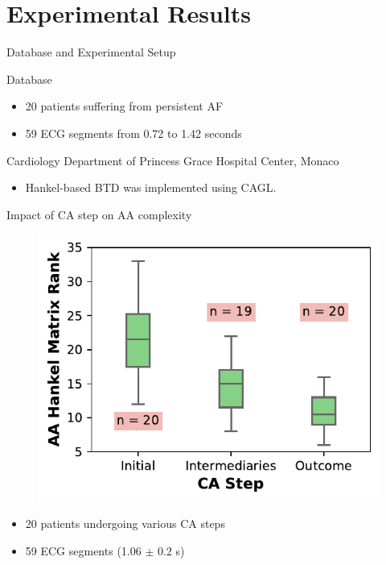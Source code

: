 \documentclass{beamer}
\begin{document}
\section{Experimental Results}

	\begin{frame}{Database and Experimental Setup} 
			
		\begin{block}{Database}
			\begin{itemize}
				\item 20 patients suffering from persistent AF
				\item 59 ECG segments from 0.72 to 1.42 seconds
			\end{itemize}
			
			\begin{center}
				Cardiology Department of Princess Grace Hospital Center, Monaco
			\end{center}					
		\end{block}	
		
		\begin{itemize}
			\item Hankel-based BTD was implemented using CAGL.
		\end{itemize}
	\end{frame}

	\begin{frame}{Impact of CA step on AA complexity}
		
		\vspace{-0.5cm}
		\begin{figure}[h]
			\centering
			\includegraphics[scale=0.9]{fig/boxplot_complexity.pdf}
		\end{figure}
		\vspace{-0.5cm}
		\begin{itemize}
			\item 20 patients undergoing various CA steps
			\item 59 ECG segments (1.06 $\pm$ 0.2 s)
		\end{itemize}
	\end{frame}
\end{document}
